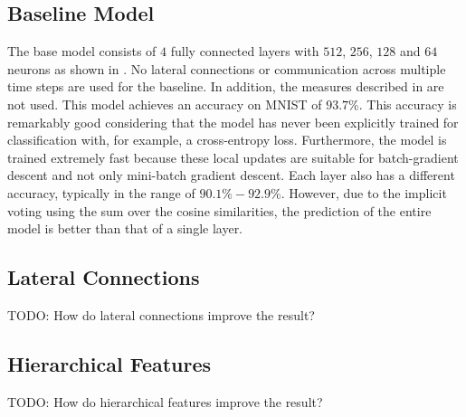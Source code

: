 \subsection{Baseline Model}
The base model consists of $4$ fully connected layers with $512$, $256$, $128$ and $64$ neurons as shown in .
No lateral connections or communication across multiple time steps are used for the baseline. In addition, the measures described in  are not used.
This model achieves an accuracy on MNIST of $93.7\%$. This accuracy is remarkably good considering that the model has never been explicitly trained for classification with, for example, a cross-entropy loss.
Furthermore, the model is trained extremely fast because these local updates are suitable for batch-gradient descent and not only mini-batch gradient descent.
Each layer also has a different accuracy, typically in the range of $90.1\% - 92.9\%$. However, due to the implicit voting using the sum over the cosine similarities, the prediction of the entire model is better than that of a single layer.


\subsection{Lateral Connections}
TODO: How do lateral connections improve the result?


\subsection{Hierarchical Features}
TODO: How do hierarchical features improve the result?










